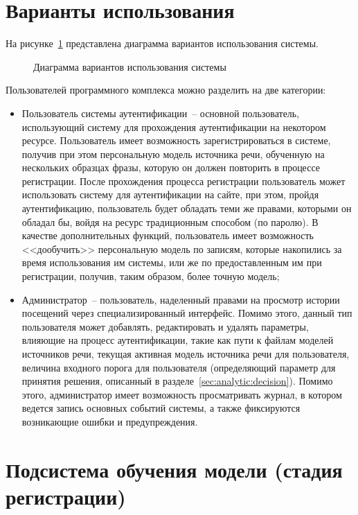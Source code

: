 \section{Варианты использования}

На рисунке~\ref{fig:use_cases} представлена диаграмма вариантов использования системы.

\begin{figure}[htp!]
    \caption{Диаграмма вариантов использования системы}
    \label{fig:use_cases}
\end{figure}

Пользователей программного комплекса можно разделить на две категории:
\begin{itemize}
\item Пользователь системы аутентификации~-- основной пользователь, использующий
систему для прохождения аутентификации на некотором ресурсе. Пользователь имеет
возможность зарегистрироваться в системе, получив при этом персональную модель
источника речи, обученную на нескольких образцах фразы, которую он должен
повторить в процессе регистрации. После прохождения процесса регистрации
пользователь может использовать систему для аутентификации на сайте, при этом,
пройдя аутентификацию, пользователь будет обладать теми же правами, которыми он
обладал бы, войдя на ресурс традиционным способом (по паролю). В качестве
дополнительных функций, пользователь имеет возможность <<дообучить>>
персональную модель по записям, которые накопились за время использования им
системы, или же по предоставленным им при регистрации, получив, таким образом, более точную модель;
\item Администратор~-- пользователь, наделенный правами на просмотр истории посещений через специализированный интерфейс. Помимо этого, данный тип пользователя может добавлять, редактировать и удалять параметры, влияющие на процесс аутентификации, такие как пути к файлам моделей источников речи, текущая активная модель источника речи для пользователя, величина входного порога для пользователя (определяющий параметр для принятия решения, описанный в разделе~\ref{sec:analytic:decision}). Помимо этого, администратор имеет возможность просматривать журнал, в котором ведется запись основных событий системы, а также фиксируются возникающие ошибки и предупреждения.
\end{itemize}

\section{Подсистема обучения модели (стадия регистрации)}
\label{sec:construct:enrollment}

